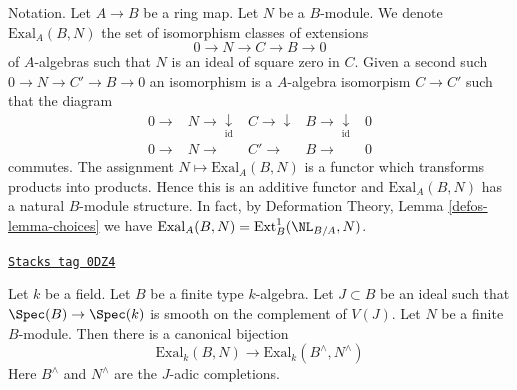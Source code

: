 Notation. Let $A \to B$ be a ring map. Let $N$ be a $B$-module.
We denote $\text{Exal}_A(B, N)$ the set of isomorphism classes
of extensions
$$
0 \to N \to C \to B \to 0
$$
of $A$-algebras such that $N$ is an ideal of square zero in $C$.
Given a second such $0 \to N \to C' \to B \to 0$ an isomorphism
is a $A$-algebra isomorpism $C \to C'$ such that the diagram
$$
\begin{array}{ccccc}0 \longrightarrow & N \longrightarrow\underset{\text{id}}{\downarrow} & C \longrightarrow\downarrow & B \longrightarrow\underset{\text{id}}{\downarrow} & 0 \\ 0 \longrightarrow & N \longrightarrow & C' \longrightarrow & B \longrightarrow & 0\end{array}
$$
commutes. The assignment $N \mapsto \text{Exal}_A(B, N)$
is a functor which transforms products into products.
Hence this is an additive functor and $\text{Exal}_A(B, N)$
has a natural $B$-module structure. In fact, by
Deformation Theory, Lemma \ref{defos-lemma-choices}
we have $\text{Exal}_A(B, N) = \text{Ext}^1_B(\NL_{B/A}, N)$.

\begin{lemma}
\label{examples-defos-lemma-first-order-completion}
\href{https://stacks.math.columbia.edu/tag/0DZ4}{\texttt{Stacks tag 0DZ4}}

Let $k$ be a field. Let $B$ be a finite type $k$-algebra.
Let $J \subset B$ be an ideal such that
$\Spec(B) \to \Spec(k)$ is smooth on the complement of $V(J)$.
Let $N$ be a finite $B$-module.
Then there is a canonical bijection
$$
\text{Exal}_k(B, N) \to \text{Exal}_k(B^\wedge, N^\wedge)
$$
Here $B^\wedge$ and $N^\wedge$ are the $J$-adic completions.
\end{lemma}

